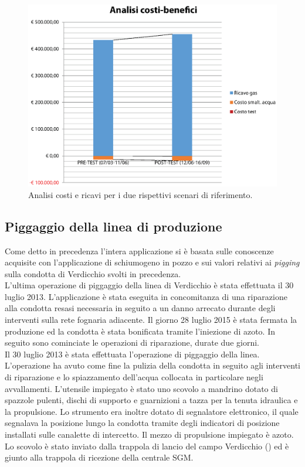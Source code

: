 \begin{figure}[htbp]
    \centering
    \includegraphics[width=\textwidth]{fig/test/graphs/costi-benefici.eps}
    \caption{Analisi costi e ricavi per i due rispettivi scenari di riferimento.} 
    \label{fig:costi-benefici}
\end{figure}


\subsection{Piggaggio della linea di produzione}
Come detto in precedenza l'intera applicazione si è basata sulle conoscenze acquisite con l'applicazione di schiumogeno in pozzo e sui valori relativi ai \textit{pigging} sulla condotta di Verdicchio svolti in precedenza.\\
L'ultima operazione di piggaggio della linea di Verdicchio è stata effettuata il 30 luglio 2013. L'applicazione è stata eseguita in concomitanza di una riparazione alla condotta resasi necessaria in seguito a un danno arrecato durante degli interventi sulla rete fognaria adiacente. Il giorno 28 luglio 2015 è stata fermata la produzione ed la condotta è stata bonificata tramite l'iniezione di azoto. In seguito sono cominciate le operazioni di riparazione, durate due giorni.\\
Il 30 luglio 2013 è stata effettuata l'operazione di piggaggio della linea. L'operazione ha avuto come fine la pulizia della condotta in seguito agli interventi di riparazione e lo spiazzamento dell'acqua collocata in particolare negli avvallamenti. L'utensile impiegato è stato uno scovolo a mandrino dotato di spazzole pulenti, dischi di supporto e guarnizioni a tazza per la tenuta idraulica e la propulsione. Lo strumento era inoltre dotato di segnalatore elettronico, il quale segnalava la posizione lungo la condotta tramite degli indicatori di posizione installati sulle canalette di intercetto. Il mezzo di propulsione impiegato è azoto. Lo scovolo è stato inviato dalla trappola di lancio del campo Verdicchio () ed è giunto alla trappola di ricezione della centrale SGM.


